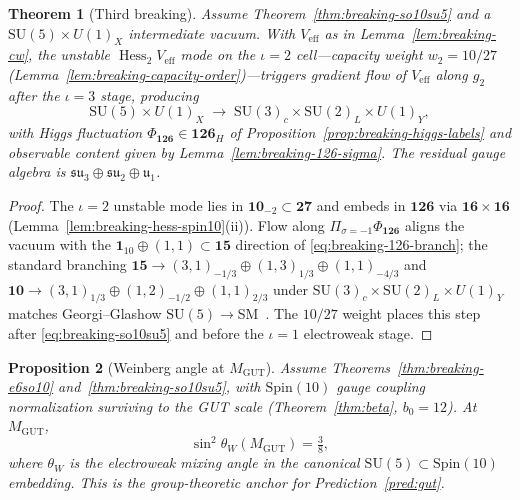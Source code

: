 \documentclass[11pt]{article}
\theoremstyle{plain}
\newtheorem{theorem}{Theorem}[section]
\newtheorem{proposition}[theorem]{Proposition}
\theoremstyle{definition}
\theoremstyle{remark}
\numberwithin{equation}{section}
\newcommand{\Spin}{\mathrm{Spin}}
\newcommand{\Hess}{\operatorname{Hess}}
\begin{document}
\begin{theorem}[Third breaking]\label{thm:breaking-su5sm}
Assume Theorem~\ref{thm:breaking-so10su5} and a
$\mathrm{SU}(5)\times U(1)_X$ intermediate vacuum. With $V_{\mathrm{eff}}$ as
in Lemma~\ref{lem:breaking-cw}, the unstable $\Hess_2 V_{\mathrm{eff}}$ mode on
the $\iota=2$ cell---capacity weight $w_2=10/27$
(Lemma~\ref{lem:breaking-capacity-order})---triggers gradient flow of
$V_{\mathrm{eff}}$ along $g_2$ after the $\iota=3$ stage, producing
\begin{equation}\label{eq:breaking-su5sm}
  \mathrm{SU}(5)\times U(1)_X
  \;\longrightarrow\;
  \mathrm{SU}(3)_c\times\mathrm{SU}(2)_L\times U(1)_Y,
\end{equation}
with Higgs fluctuation $\Phi_{\mathbf{126}}\in\mathbf{126}_H$ of
Proposition~\ref{prop:breaking-higgs-labels} and observable content given by
Lemma~\ref{lem:breaking-126-sigma}. The residual gauge algebra is
$\mathfrak{su}_3\oplus\mathfrak{su}_2\oplus\mathfrak{u}_1$.
\end{theorem}

\begin{proof}
The $\iota=2$ unstable mode lies in $\mathbf{10}_{-2}\subset\mathbf{27}$ and
embeds in $\mathbf{126}$ via $\mathbf{16}\times\mathbf{16}$
(Lemma~\ref{lem:breaking-hess-spin10}(ii)). Flow along
$\Pi_{\sigma=-1}\Phi_{\mathbf{126}}$ aligns the vacuum with the
$\mathbf{1}_{10}\oplus(1,1)\subset\mathbf{15}$ direction of
\eqref{eq:breaking-126-branch}; the standard branching
$\mathbf{15}\to(3,1)_{-1/3}\oplus(1,3)_{1/3}\oplus(1,1)_{-4/3}$ and
$\mathbf{10}\to(3,1)_{1/3}\oplus(1,2)_{-1/2}\oplus(1,1)_{2/3}$ under
$\mathrm{SU}(3)_c\times\mathrm{SU}(2)_L\times U(1)_Y$ matches Georgi--Glashow
$\mathrm{SU}(5)\to$SM~\cite{GeorgiGlashow1974}. The $10/27$ weight places this
step after \eqref{eq:breaking-so10su5} and before the $\iota=1$
electroweak stage.
\end{proof}

\begin{proposition}[Weinberg angle at $M_{\mathrm{GUT}}$]
\label{prop:weinberg-gut}
Assume Theorems~\ref{thm:breaking-e6so10} and~\ref{thm:breaking-so10su5}, with
$\Spin(10)$ gauge coupling normalization surviving to the GUT scale
(Theorem~\ref{thm:beta}, $b_0=12$). At $M_{\mathrm{GUT}}$,
\begin{equation}\label{eq:weinberg-gut}
  \sin^2\theta_W(M_{\mathrm{GUT}})=\tfrac38,
\end{equation}
where $\theta_W$ is the electroweak mixing angle in the canonical
$\mathrm{SU}(5)\subset\Spin(10)$ embedding. This is the group-theoretic anchor
for Prediction~\ref{pred:gut}.
\end{proposition}
\end{document}
